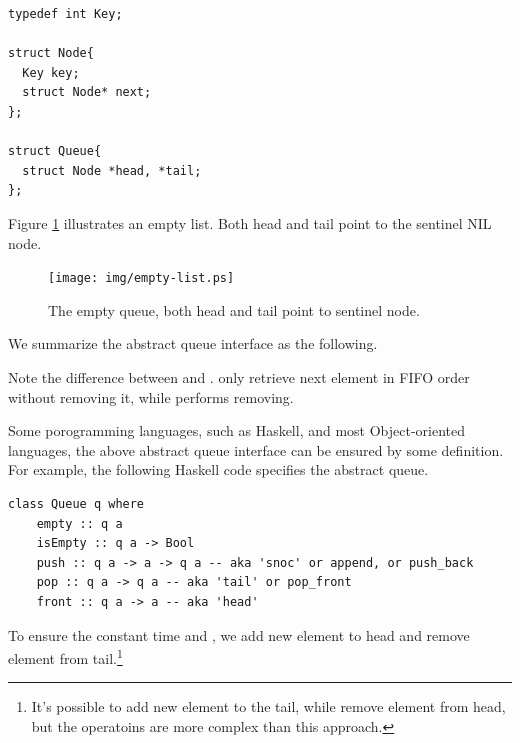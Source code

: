 \documentclass{article}
\begin{document}
\lstset{language=C}
\begin{lstlisting}
typedef int Key;

struct Node{
  Key key;
  struct Node* next;
};

struct Queue{
  struct Node *head, *tail;
};
\end{lstlisting}

Figure \ref{fig:empty-list} illustrates an empty list. Both head
and tail point to the sentinel NIL node.

\begin{figure}[htbp]
  \centering
  \texttt{[image: img/empty-list.ps]}
  \caption{The empty queue, both head and tail point to sentinel node.} \label{fig:empty-list}
\end{figure}

We summarize the abstract queue interface as the following.

\begin{algorithmic}
\EndFunction
{}
\EndFunction
{}
\EndFunction
{}
\EndFunction
{}
\EndFunction
\end{algorithmic}

Note the difference between  and .
 only retrieve next element in FIFO order without removing
it, while  performs removing.

Some porogramming languages, such as Haskell, and most Object-oriented
languages, the above abstract queue interface can be ensured by some definition.
For example, the following Haskell code specifies the abstract queue.

\lstset{language=Haskell}
\begin{lstlisting}
class Queue q where
    empty :: q a
    isEmpty :: q a -> Bool
    push :: q a -> a -> q a -- aka 'snoc' or append, or push_back
    pop :: q a -> q a -- aka 'tail' or pop_front
    front :: q a -> a -- aka 'head'
\end{lstlisting}

To ensure the constant time  and ,
we add new element to head and remove element from tail.\footnote{It's possible
to add new element to the tail, while remove element from head, but the 
operatoins are more complex than this approach.}
\end{document}
